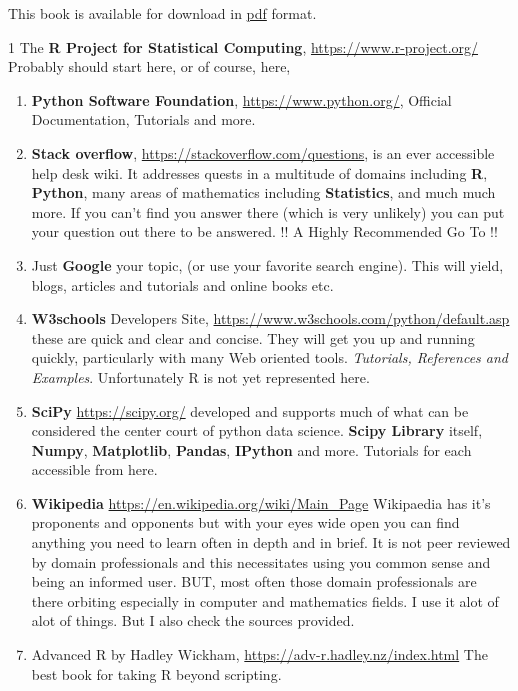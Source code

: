 \documentclass[]{book}
\theoremstyle{definition}
\theoremstyle{definition}
\theoremstyle{definition}
\theoremstyle{remark}
\begin{document}
This book is available for download in \href{RPythonBookc.pdf}{pdf}
format.

1 The \textbf{R Project for Statistical Computing},
\url{https://www.r-project.org/} Probably should start here, or of
course, here,

\begin{enumerate}
\def\labelenumi{\arabic{enumi}.}
\setcounter{enumi}{1}
\item
  \textbf{Python Software Foundation}, \url{https://www.python.org/},
  Official Documentation, Tutorials and more.
\item
  \textbf{Stack overflow}, \url{https://stackoverflow.com/questions}, is
  an ever accessible help desk wiki. It addresses quests in a multitude
  of domains including \textbf{R}, \textbf{Python}, many areas of
  mathematics including \textbf{Statistics}, and much much more. If you
  can't find you answer there (which is very unlikely) you can put your
  question out there to be answered. !! A Highly Recommended Go To !!
\item
  Just \textbf{Google} your topic, (or use your favorite search engine).
  This will yield, blogs, articles and tutorials and online books etc.
\item
  \textbf{W3schools} Developers Site,
  \url{https://www.w3schools.com/python/default.asp} these are quick and
  clear and concise. They will get you up and running quickly,
  particularly with many Web oriented tools. \emph{Tutorials, References
  and Examples}. Unfortunately R is not yet represented here.
\item
  \textbf{SciPy} \url{https://scipy.org/} developed and supports much of
  what can be considered the center court of python data science.
  \textbf{Scipy Library} itself, \textbf{Numpy}, \textbf{Matplotlib},
  \textbf{Pandas}, \textbf{IPython} and more. Tutorials for each
  accessible from here.
\item
  \textbf{Wikipedia} \url{https://en.wikipedia.org/wiki/Main_Page}
  Wikipaedia has it's proponents and opponents but with your eyes wide
  open you can find anything you need to learn often in depth and in
  brief. It is not peer reviewed by domain professionals and this
  necessitates using you common sense and being an informed user. BUT,
  most often those domain professionals are there orbiting especially in
  computer and mathematics fields. I use it alot of alot of things. But
  I also check the sources provided.
\item
  Advanced R by Hadley Wickham, \url{https://adv-r.hadley.nz/index.html}
  The best book for taking R beyond scripting.
\end{enumerate}
\end{document}
